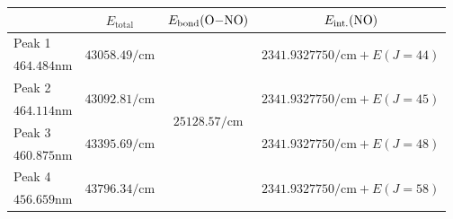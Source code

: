 \documentclass[aspectratio=1610,scheme=plain]{ctexbeamer}
\begin{document}
	\begin{frame}{\insertsubsection}{\insertsubsubsection}
		\begin{table}[htbp]
			\centering
			\tiny
			\begin{tabularx}{0.9\textwidth}{lccc}
				\toprule
				& $E_\text{total}$ & $E_\text{bond}(\ce{O-NO})$\footfullcite{ono} & $E_\text{int.}(\ce{NO})$ \\
				\midrule
				Peak 1 & \multirow{2}[2]{*}{$\num{43058.49}\unit{\per \centi \meter}$} & \multirow{8}[8]{*}{$\num{25128.57}\unit{\per \centi \meter}$} & \multirow{2}[2]{*}{$\num{2341.9327750}\unit{\per \centi \meter}+ E( J = 44 )$} \\
				$\num{464.484}\unit{\nano\meter}$ & & & \\
				\cmidrule{1-2}\cmidrule{4-4}
				Peak 2 & \multirow{2}[2]{*}{$\num{43092.81}\unit{\per \centi \meter}$} & & \multirow{2}[2]{*}{$\num{2341.9327750}\unit{\per \centi \meter}+ E( J = 45 )$} \\
				$\num{464.114}\unit{\nano\meter}$ & & & \\
				\cmidrule{1-2}\cmidrule{4-4}
				Peak 3 & \multirow{2}[2]{*}{$\num{43395.69}\unit{\per \centi \meter}$} & & \multirow{2}[2]{*}{$\num{2341.9327750}\unit{\per \centi \meter}+ E( J = 48 )$} \\
				$\num{460.875}\unit{\nano\meter}$ & & & \\
				\cmidrule{1-2}\cmidrule{4-4}
				Peak 4 & \multirow{2}[2]{*}{$\num{43796.34}\unit{\per \centi \meter}$} & & \multirow{2}[2]{*}{$\num{2341.9327750}\unit{\per \centi \meter}+ E( J = 58 )$} \\
				$\num{456.659}\unit{\nano\meter}$ & & & \\
				\bottomrule
			\end{tabularx}
		\end{table}
	\end{frame}	
\end{document}
